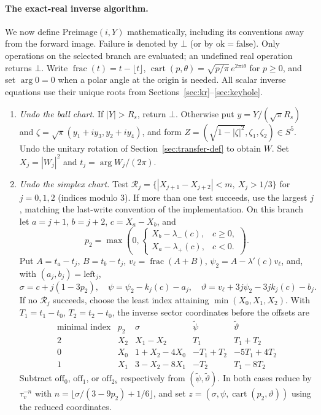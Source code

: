 \paragraph{The exact-real inverse algorithm.}\label{alg:preimage}
We now define $\mathrm{Preimage}(i,Y)$ mathematically, including its conventions away from the forward image.
Failure is denoted by $\bot$ (or by $\mathrm{ok}=\mathrm{false}$). Only operations on the selected branch are
evaluated; an undefined real operation returns $\bot$. Write $\operatorname{frac}(t)=t-\lfloor t\rfloor$,
$\operatorname{cart}(p,\theta)=\sqrt{p/\pi}\,e^{2\pi i\theta}$ for $p\ge0$, and set $\arg0=0$ when a polar angle
at the origin is needed. All scalar inverse equations use their unique roots from Sections~\ref{sec:kr}--\ref{sec:keyhole}.

\begin{enumerate}[label=\textbf{\arabic*.},leftmargin=2em]
\item \emph{Undo the ball chart.} If $|Y|>R_s$, return $\bot$. Otherwise put
$y=Y/(\sqrt\pi R_s)$ and $\zeta=\sqrt\pi(y_1+iy_3,y_2+iy_4)$, and form
$Z=(\sqrt{1-|\zeta|^2},\zeta_1,\zeta_2)\in S^5$. Undo the unitary rotation of
Section~\ref{sec:transfer-def} to obtain $W$. Set $X_j=|W_j|^2$ and $t_j=\arg W_j/(2\pi)$.

\item \emph{Undo the simplex chart.} Test
$\mathcal R_j=\{|X_{j+1}-X_{j+2}|<m,\ X_j>1/3\}$ for $j=0,1,2$ (indices modulo $3$).
If more than one test succeeds, use the largest $j$, matching the last-write convention of the implementation.
On this branch let $a=j+1$, $b=j+2$, $c=X_a-X_b$, and
\[
 p_2=\max\!\left(0,\begin{cases}X_b-\lambda_-(c),&c\ge0,\\X_a-\lambda_+(c),&c<0.\end{cases}\right).
\]
Put $A=t_a-t_j$, $B=t_b-t_j$, $v_\ell=\operatorname{frac}(A+B)$,
$\psi_2=A-\lambda'(c)v_\ell$, and, with $(a_j,b_j)=\mathrm{left}_j$,
\[
 \sigma=c+j(1-3p_2),\quad \psi=\psi_2-k_j(c)-a_j,\quad
 \vartheta=v_\ell+3j\psi_2-3jk_j(c)-b_j.
\]
If no $\mathcal R_j$ succeeds, choose the least index attaining $\min(X_0,X_1,X_2)$.
With $T_1=t_1-t_0$, $T_2=t_2-t_0$, the inverse sector coordinates before the offsets are
\[
\begin{array}{c|cccc}
\text{minimal index}&p_2&\sigma&\widetilde\psi&\widetilde\vartheta\\\hline
2&X_2&X_1-X_2&T_1&T_1+T_2\\
0&X_0&1+X_2-4X_0&-T_1+T_2&-5T_1+4T_2\\
1&X_1&3-X_2-8X_1&-T_2&T_1-8T_2
\end{array}
\]
Subtract $\mathrm{off}_0$, $\mathrm{off}_1$, or $\mathrm{off}_{2s}$ respectively from
$(\widetilde\psi,\widetilde\vartheta)$. In both cases reduce by $\tau_v^{-n}$ with
$n=\lfloor\sigma/(3-9p_2)+1/6\rfloor$, and set
$z=(\sigma,\psi,\operatorname{cart}(p_2,\vartheta))$ using the reduced coordinates.


\end{enumerate}
